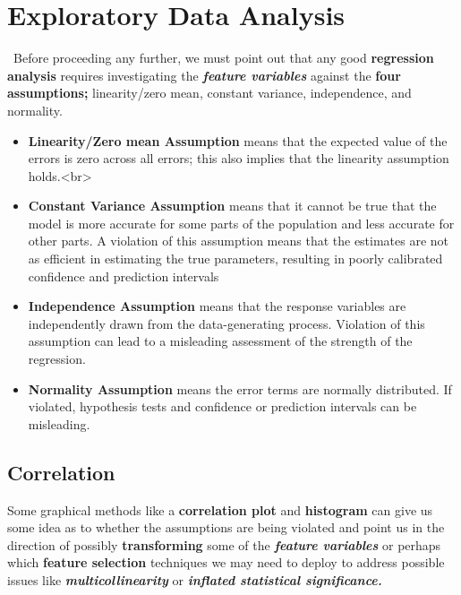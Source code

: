 \documentclass{article}
\begin{document}
\section{Exploratory Data Analysis} \label{eda}

\
Before proceeding any further, we must point out that any good \textbf{regression analysis} requires investigating the \textbf{\textit{feature variables}} against the \textbf{four assumptions;} linearity/zero mean, constant variance, independence, and normality.
\begin{itemize}
\item \textbf{Linearity/Zero mean Assumption} means that the expected value of the errors is zero across all errors; this also implies that the linearity assumption holds.<br>
\item \textbf{Constant Variance Assumption} means that it cannot be true that the model is more accurate for some parts of the population and less accurate for other parts. A violation of this assumption means that the estimates are not as efficient in estimating the true parameters, resulting in poorly calibrated confidence and prediction intervals
\item \textbf{Independence Assumption} means that the response variables are independently drawn from the data-generating process. Violation of this assumption can lead to a misleading assessment of the strength of the regression.
\item \textbf{Normality Assumption} means the error terms are normally distributed. If violated, hypothesis tests and confidence or prediction intervals can be misleading.

\end{itemize}

\subsection{Correlation}
Some graphical methods like a \textbf{correlation plot} and \textbf{histogram} can give us some idea as to whether the assumptions are being violated and point us in the direction of possibly \textbf{transforming} some of the \textbf{\textit{feature variables}} or perhaps which \textbf{feature selection} techniques we may need to deploy to address possible issues like \textbf{\textit{multicollinearity}} or \textbf{\textit{inflated statistical significance.}}
\end{document}
